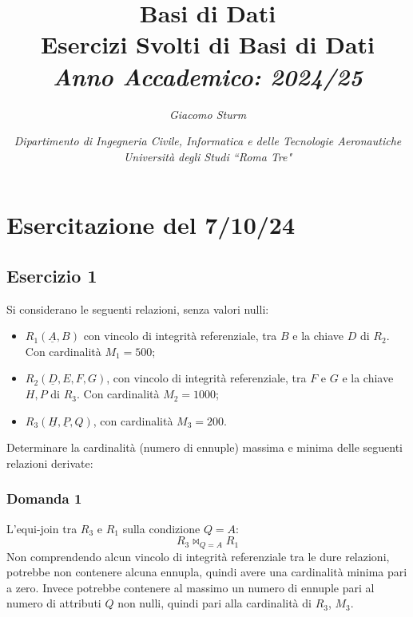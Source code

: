 \documentclass{article}
\numberwithin{equation}{subsection}
\begin{document}
\title{%
    \textbf{Basi di Dati}  \\ 
    \large Esercizi Svolti di Basi di Dati \\
    \textit{Anno Accademico: 2024/25}}
\author{\textit{Giacomo Sturm}}
\date{\textit{Dipartimento di Ingegneria Civile, Informatica e delle Tecnologie Aeronautiche \\
Università degli Studi ``Roma Tre"}}

\maketitle
\thispagestyle{link}

\clearpage


\pagestyle{fancy}
\fancyhead{}\fancyfoot{}
\fancyfoot[C]{\thepage}

\tableofcontents

\clearpage
{}

\section{Esercitazione del 7/10/24}

\subsection{Esercizio 1}

Si considerano le seguenti relazioni, senza valori nulli:
\begin{itemize}
    \item $R_1(\underline{A},B)$ con vincolo di integrità referenziale, tra $B$ e la chiave $D$ di $R_2$. Con cardinalità $M_1=500$;
    \item $R_2(\underline{D},E,F,G)$, con vincolo di integrità referenziale, tra $F$ e $G$ e la chiave $H,P$ di $R_3$. Con cardinalità $M_2=1000$;
    \item $R_3(\underline{H},\underline{P},Q)$, con cardinalità $M_3=200$.
\end{itemize}

Determinare la cardinalità (numero di ennuple) massima e minima delle seguenti relazioni derivate:

\subsubsection*{Domanda 1}

L'equi-join tra $R_3$ e $R_1$ sulla condizione $Q=A$:
\begin{equation*}
    R_3\Join_{Q=A}R_1
\end{equation*}
Non comprendendo alcun vincolo di integrità referenziale tra le dure relazioni, potrebbe non contenere alcuna ennupla, quindi avere una cardinalità minima pari a zero. 
Invece potrebbe contenere al massimo un numero di ennuple pari al numero di attributi $Q$ non nulli, quindi pari alla cardinalità di $R_3$, $M_3$. 
\end{document}
